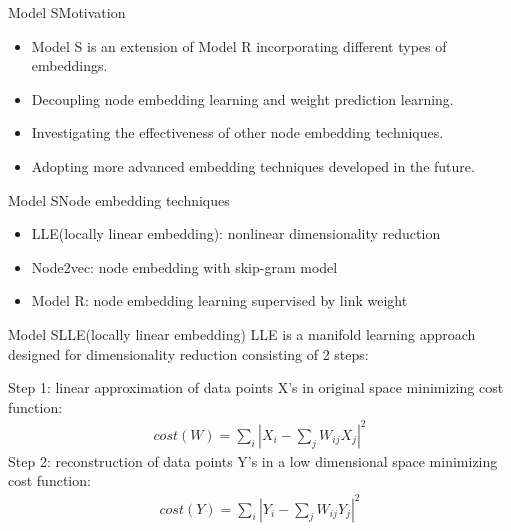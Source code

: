 \documentclass{beamer}
\begin{document}
\begin{frame}{Model S}{Motivation}
	\begin{itemize}
		\item Model S is an extension of Model R incorporating different types of embeddings.
		\item Decoupling node embedding learning and weight prediction learning.
		\item Investigating the effectiveness of other node embedding techniques.
		\item Adopting more advanced embedding techniques developed in the future.
	\end{itemize}
\end{frame}

\begin{frame}{Model S}{Node embedding techniques}
	\begin{itemize}
		\item LLE(locally linear embedding): nonlinear dimensionality reduction
		\item Node2vec: node embedding with skip-gram model
		\item Model R: node embedding learning supervised by link weight
	\end{itemize}
\end{frame}

\begin{frame}{Model S}{LLE(locally linear embedding)}
	LLE is a manifold learning approach designed for dimensionality reduction consisting of 2 steps:
	
	Step 1: linear approximation of data points X's in original space minimizing cost function:
	\begin{align*}
		cost(W) = \sum_i |X_i - \sum_jW_{ij}X_j|^2
	\end{align*}
	Step 2: reconstruction of data points Y's in a low dimensional space minimizing cost function:
	\begin{align*}
		cost(Y) = \sum_i |Y_i - \sum_jW_{ij}Y_j|^2
	\end{align*}
\end{frame}
\end{document}
